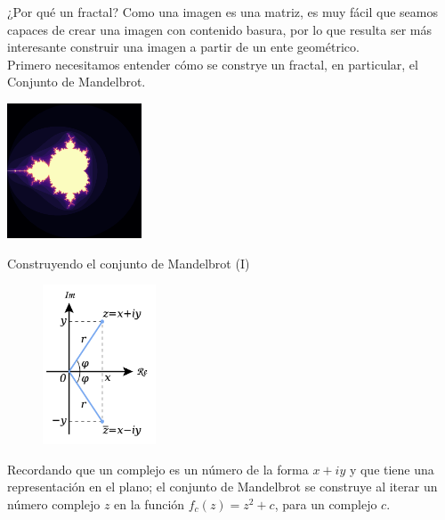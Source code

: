 \documentclass[usenames,dvipsnames]{beamer}
\begin{document}
  \begin{frame}{¿Por qué un fractal?}
    Como una imagen es una matriz, es muy fácil que seamos capaces de crear
    una imagen con contenido basura, por lo que resulta ser más interesante
    construir una imagen a partir de un ente geométrico.\\
    \vspace*{0.3cm}
    Primero necesitamos entender cómo se constrye un fractal, en particular,
    el Conjunto de Mandelbrot.
    \begin{center}
      \includegraphics[width=0.3\textwidth]{imgs/mini_mandel}
    \end{center}
  \end{frame}

  \begin{frame}{Construyendo el conjunto de Mandelbrot (I)}
    \begin{figure}
      \begin{center}
        \vspace*{-1.5cm}
        \includegraphics[width=0.3\textwidth]{imgs/complex}
      \end{center}
    \end{figure}
    Recordando que un complejo es un número de la forma $x+iy$ y que tiene una
    representación en el plano; el conjunto de Mandelbrot se construye al iterar
    un número complejo $z$ en la función $f_c(z) = z^2 + c$, para un complejo $c$.
  \end{frame}
\end{document}
